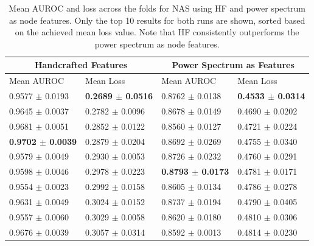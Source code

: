 \documentclass[a4paper,fleqn]{cas-sc}
\begin{document}
\begin{table}[H]
\centering
\begin{tabular}{|p{2.22cm}|p{2.22cm}|p{2.22cm}|p{2.22cm}|}
\hline
 \multicolumn{2}{|c|}{Handcrafted Features} & \multicolumn{2}{c|}{Power Spectrum as Features} \\
\hline
Mean AUROC & Mean Loss & Mean AUROC & Mean Loss \\
\hline
0.9577 $\pm$ 0.0193 & \textbf{0.2689 $\pm$ 0.0516} & 0.8762 $\pm$ 0.0138 & \textbf{0.4533 $\pm$ 0.0314} \\
\hline
0.9645 $\pm$ 0.0037 & 0.2782 $\pm$ 0.0096 & 0.8678 $\pm$ 0.0149 & 0.4690 $\pm$ 0.0202 \\
\hline
0.9681 $\pm$ 0.0051 & 0.2852 $\pm$ 0.0122 & 0.8560 $\pm$ 0.0127 & 0.4721 $\pm$ 0.0224 \\
\hline
\textbf{0.9702 $\pm$ 0.0039} & 0.2879 $\pm$ 0.0204 & 0.8692 $\pm$ 0.0269 & 0.4755 $\pm$ 0.0340 \\
\hline
0.9579 $\pm$ 0.0049 & 0.2930 $\pm$ 0.0053 & 0.8726 $\pm$ 0.0232 & 0.4760 $\pm$ 0.0291 \\
\hline
0.9598 $\pm$ 0.0046 & 0.2978 $\pm$ 0.0223 & \textbf{0.8793 $\pm$ 0.0173} & 0.4781 $\pm$ 0.0171 \\
\hline
0.9554 $\pm$ 0.0023 & 0.2992 $\pm$ 0.0158 & 0.8605 $\pm$ 0.0134 & 0.4786 $\pm$ 0.0278 \\
\hline
0.9631 $\pm$ 0.0049 & 0.3024 $\pm$ 0.0152 & 0.8737 $\pm$ 0.0194 & 0.4790 $\pm$ 0.0405 \\
\hline
0.9557 $\pm$ 0.0060 & 0.3029 $\pm$ 0.0058 & 0.8620 $\pm$ 0.0180 & 0.4810 $\pm$ 0.0306 \\
\hline
0.9676 $\pm$ 0.0039 & 0.3057 $\pm$ 0.0314 & 0.8592 $\pm$ 0.0013 & 0.4814 $\pm$ 0.0230 \\
\hline
\end{tabular}
\caption{Mean AUROC and loss across the folds for NAS using HF and power spectrum as node features. Only the top 10 results for both runs are shown, sorted based on the achieved mean loss value. Note that HF consistently outperforms the power spectrum as node features.}
\label{tab:nas-results-merged}
\end{table}
\FloatBarrier
\end{document}
